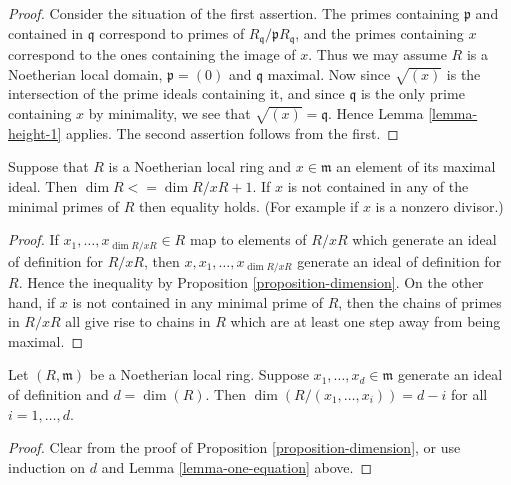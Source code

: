 \begin{proof}
Consider the situation of the first assertion.
The primes containing $\mathfrak p$ and contained
in $\mathfrak q$ correspond to primes of
$R_{\mathfrak q}/\mathfrak pR_{\mathfrak q}$, and
the primes containing $x$ correspond to the ones containing
the image of $x$. Thus we may assume $R$ is a Noetherian local domain,
$\mathfrak p = (0)$ and $\mathfrak q$ maximal. Now since
$\sqrt{(x)}$ is the intersection of the prime ideals
containing it, and since $\mathfrak q$ is the only prime
containing $x$ by minimality, we see that $\sqrt{(x)} = \mathfrak q$.
Hence Lemma \ref{lemma-height-1} applies.
The second assertion follows from the first.
\end{proof}

\begin{lemma}
\label{lemma-one-equation}
Suppose that $R$ is a Noetherian local ring and $x\in \mathfrak m$ an
element of its maximal ideal. Then $\dim R <= \dim R/xR + 1$.
If $x$ is not contained in any of the minimal primes of $R$
then equality holds. (For example if $x$ is a nonzero divisor.)
\end{lemma}

\begin{proof}
If $x_1, \ldots, x_{\dim R/xR} \in R$ map to elements of $R/xR$ which
generate an ideal of definition for $R/xR$, then $x, x_1, \ldots,
x_{\dim R/xR}$ generate an ideal of definition for $R$. Hence
the inequality by Proposition \ref{proposition-dimension}.
On the other hand, if $x$ is not contained in any minimal
prime of $R$, then the chains of primes in $R/xR$ all give
rise to chains in $R$ which are at least one step away
from being maximal.
\end{proof}

\begin{lemma}
\label{lemma-elements-generate-ideal-definition}
Let $(R, \mathfrak m)$ be a Noetherian local ring.
Suppose $x_1, \ldots, x_d \in \mathfrak m$ generate an
ideal of definition and $d = \dim(R)$. Then
$\dim(R/(x_1, \ldots, x_i)) = d - i$ for all $i = 1, \ldots, d$.
\end{lemma}

\begin{proof}
Clear from the proof of Proposition \ref{proposition-dimension},
or use induction on $d$ and Lemma \ref{lemma-one-equation} above.
\end{proof}








